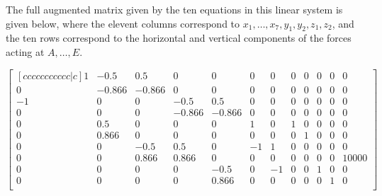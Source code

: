 \begin{observation}
The full augmented matrix given by the ten equations in this linear system
is given below, where the elevent columns correspond to \(x_1,\dots,x_7,y_1,y_2,z_1,z_2\),
and the ten rows correspond to the horizontal and vertical components of the
forces acting at \(A,\dots,E\).


\[
\begin{bmatrix}[ccccccccccc|c]
1&-0.5&0.5&0&0&0&0&0&0&0&0&0\\
0&-0.866&-0.866&0&0&0&0&0&0&0&0&0\\
-1&0&0&-0.5&0.5&0&0&0&0&0&0&0\\
0&0&0&-0.866&-0.866&0&0&0&0&0&0&0\\
0&0.5&0&0&0&1&0&1&0&0&0&0\\
0&0.866&0&0&0&0&0&0&1&0&0&0\\
0&0&-0.5&0.5&0&-1&1&0&0&0&0&0\\
0&0&0.866&0.866&0&0&0&0&0&0&0&10000\\
0&0&0&0&-0.5&0&-1&0&0&1&0&0\\
0&0&0&0&0.866&0&0&0&0&0&1&0\\
\end{bmatrix}
\]
\end{observation}

